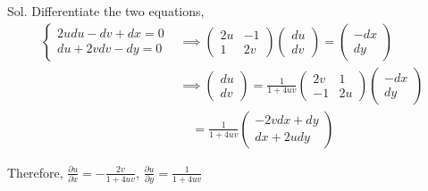 \begin{enumerate}
\begin{example}
              Sol. Differentiate the two equations,
              \begin{align*}
                  \begin{cases}
                      2udu-dv+dx=0 \\
                      du+2vdv-dy=0
                  \end{cases}
                   & \implies\begin{pmatrix}
                                 2u & -1 \\
                                 1  & 2v
                             \end{pmatrix}\begin{pmatrix}du\\dv\end{pmatrix}=\begin{pmatrix}-dx\\dy\end{pmatrix} \\
                   & \implies\begin{pmatrix}du\\dv\end{pmatrix}
                  =\frac{1}{1+4uv}\begin{pmatrix}
                                      2v & 1  \\
                                      -1 & 2u
                                  \end{pmatrix}\begin{pmatrix}-dx\\dy\end{pmatrix}                               \\
                   & \quad=\frac{1}{1+4uv}\begin{pmatrix}
                                              -2vdx+dy \\
                                              dx+2udy
                                          \end{pmatrix}
              \end{align*}

              Therefore, $\frac{\partial u}{\partial x}=-\frac{2v}{1+4uv}$, $\frac{\partial u}{\partial y}=\frac{1}{1+4uv}$
          \end{example}
\end{enumerate}